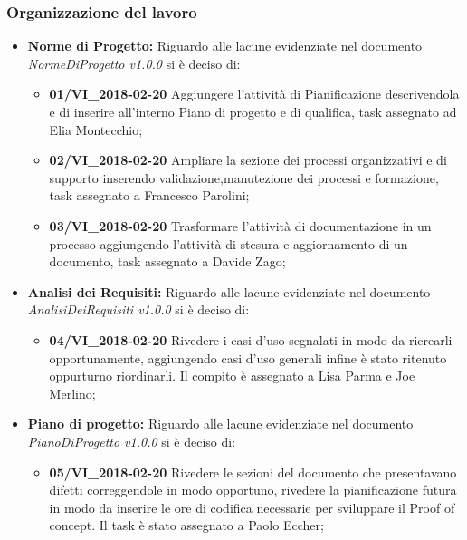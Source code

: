 \documentclass[a4paper, oneside, openany]{article}
\begin{document}
	\subsubsection{Organizzazione del lavoro}
    \begin{itemize}
    \item  \textbf{Norme di Progetto:} Riguardo alle lacune evidenziate nel documento \emph{NormeDiProgetto v1.0.0} si è deciso di:
    	\begin{itemize}
    	\item  \textbf{ 01/VI\_2018-02-20 } Aggiungere l'attività di Pianificazione descrivendola e di inserire all'interno Piano di progetto e di qualifica, task assegnato ad Elia Montecchio;
    	
    	\item  \textbf{ 02/VI\_2018-02-20 } Ampliare la sezione dei processi organizzativi e di supporto inserendo validazione,manutezione dei processi e formazione, task assegnato a Francesco Parolini;
    	
    	\item  \textbf{ 03/VI\_2018-02-20 } Trasformare l'attività di documentazione in un processo aggiungendo l'attività di stesura e aggiornamento di un documento, task assegnato a Davide Zago;
    		
       \end{itemize}
   
   
    \item  \textbf{Analisi dei Requisiti:} Riguardo alle lacune evidenziate nel documento \emph{AnalisiDeiRequisiti v1.0.0} si è deciso di:
   \begin{itemize}
   	\item  \textbf{ 04/VI\_2018-02-20 } Rivedere i casi d'uso segnalati in modo da ricrearli opportunamente,
   	 aggiungendo casi d'uso generali infine è stato ritenuto oppurturno riordinarli. Il compito è assegnato a Lisa Parma e Joe Merlino;
   	
   	
   \end{itemize}


    \item  \textbf{Piano di progetto:} Riguardo alle lacune evidenziate nel documento \emph{PianoDiProgetto v1.0.0} si è deciso di:
     \begin{itemize}
    	\item  \textbf{ 05/VI\_2018-02-20 } Rivedere le sezioni del documento che presentavano difetti correggendole in modo opportuno, rivedere la pianificazione futura in modo da inserire le ore di codifica necessarie per sviluppare il Proof of concept. Il task è stato assegnato a Paolo Eccher;
    	

\end{itemize}
\end{itemize}
\end{document}
